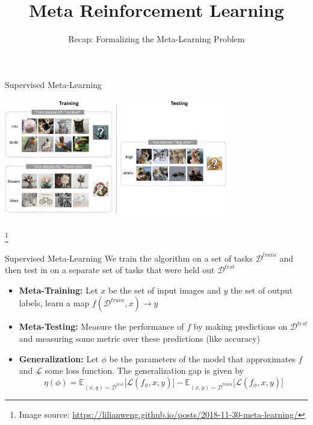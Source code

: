 \documentclass[aspectratio=169]{../latex_main/tntbeamer}  %
\title[Meta-RL]{Meta Reinforcement Learning}
\subtitle{Recap: Formalizing the Meta-Learning Problem}
\begin{document}
	
\maketitle

\begin{frame}{Supervised Meta-Learning}

    \centering
    \vspace{-1em}
    \includegraphics[width=0.73\textwidth]{images/t02/few-shot-classification.png}

    \footnote{Image source: \url{https://lilianweng.github.io/posts/2018-11-30-meta-learning/}}
\end{frame}


\begin{frame}{Supervised Meta-Learning}
    We train the algorithm on a set of tasks $\mathcal{D}^{train}$ and then test in on a separate set of tasks that were held out $\mathcal{D}^{test}$
    \pause
    \vfill 
    
    \begin{itemize}
        \item \textbf{Meta-Training:} Let $x$ be the set of input images and $y$ the set of output labels, learn a map $f(\mathcal{D}^{train}, x) \to y$
        \pause
        \item \textbf{Meta-Testing:} Measure the performance of $f$ by making predictions on $\mathcal{D}^{test}$ and measuring some metric over these predictions (like accuracy)
        \pause
        \item \textbf{Generalization:} Let $\phi$ be the parameters of the model that approximates $f$ and $\mathcal{L}$ some loss function. The generalization gap is given by 
        \[
            \eta(\phi) = \mathbb{E}_{(x,y) \sim \mathcal{D}^{test}}\big [\mathcal{L} (f_\phi, x, y)] - \mathbb{E}_{(x,y) \sim \mathcal{D}^{train}}\big [\mathcal{L} (f_\phi, x, y)] 
        \]
    \end{itemize}
\end{frame}
\end{document}
